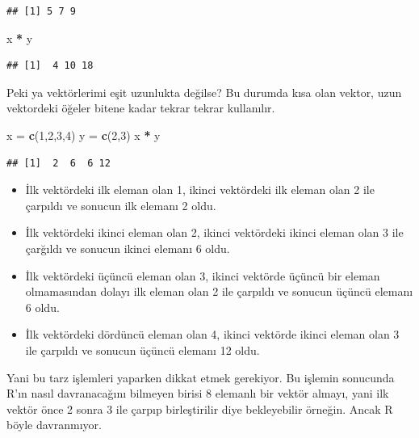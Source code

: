\documentclass[
]{book}
\newenvironment{Shaded}{\begin{snugshade}}{\end{snugshade}}
\newcommand{\DecValTok}[1]{\textcolor[rgb]{0.00,0.00,0.81}{#1}}
\newcommand{\KeywordTok}[1]{\textcolor[rgb]{0.13,0.29,0.53}{\textbf{#1}}}
\newcommand{\NormalTok}[1]{#1}
\newcommand{\OperatorTok}[1]{\textcolor[rgb]{0.81,0.36,0.00}{\textbf{#1}}}
\newcommand{\StringTok}[1]{\textcolor[rgb]{0.31,0.60,0.02}{#1}}
\providecommand{\tightlist}{%
  \setlength{\itemsep}{0pt}\setlength{\parskip}{0pt}}
\begin{document}
\begin{verbatim}
## [1] 5 7 9
\end{verbatim}

\begin{Shaded}
\begin{Highlighting}[]
\NormalTok{x }\OperatorTok{*}\StringTok{ }\NormalTok{y}
\end{Highlighting}
\end{Shaded}

\begin{verbatim}
## [1]  4 10 18
\end{verbatim}

Peki ya vektörlerimi eşit uzunlukta değilse? Bu durumda kısa olan vektor, uzun vektordeki öğeler bitene kadar tekrar tekrar kullanılır.

\begin{Shaded}
\begin{Highlighting}[]
\NormalTok{x =}\StringTok{ }\KeywordTok{c}\NormalTok{(}\DecValTok{1}\NormalTok{,}\DecValTok{2}\NormalTok{,}\DecValTok{3}\NormalTok{,}\DecValTok{4}\NormalTok{)}
\NormalTok{y =}\StringTok{ }\KeywordTok{c}\NormalTok{(}\DecValTok{2}\NormalTok{,}\DecValTok{3}\NormalTok{)}
\NormalTok{x }\OperatorTok{*}\StringTok{ }\NormalTok{y}
\end{Highlighting}
\end{Shaded}

\begin{verbatim}
## [1]  2  6  6 12
\end{verbatim}

\begin{itemize}
\tightlist
\item
  İlk vektördeki ilk eleman olan 1, ikinci vektördeki ilk eleman olan 2 ile çarpıldı ve sonucun ilk elemanı 2 oldu.
\item
  İlk vektördeki ikinci eleman olan 2, ikinci vektördeki ikinci eleman olan 3 ile çarğıldı ve sonucun ikinci elemanı 6 oldu.
\item
  İlk vektördeki üçüncü eleman olan 3, ikinci vektörde üçüncü bir eleman olmamasından dolayı ilk eleman olan 2 ile çarpıldı ve sonucun üçüncü elemanı 6 oldu.
\item
  İlk vektördeki dördüncü eleman olan 4, ikinci vektörde ikinci eleman olan 3 ile çarpıldı ve sonucun üçüncü elemanı 12 oldu.
\end{itemize}

Yani bu tarz işlemleri yaparken dikkat etmek gerekiyor. Bu işlemin sonucunda R'ın nasıl davranacağını bilmeyen birisi 8 elemanlı bir vektör almayı, yani ilk vektör önce 2 sonra 3 ile çarpıp birleştirilir diye bekleyebilir örneğin. Ancak R böyle davranmıyor.
\end{document}
